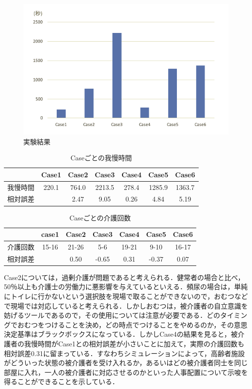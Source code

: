 \begin{figure}[htb]
\begin{center}
 \includegraphics[scale=0.5]{figures/result_1.png}
 \caption[実験結果]{実験結果 \label{result_v1}}
\end{center}
\end{figure}

\begin{table}[htb]
  \caption[Caseごとの我慢時間]{Caseごとの我慢時間}
  \label{relative_error}
  \centering
  \begin{tabular}{r|c|c|c|c|c|c}
     & Case1 & Case2 & Case3 & Case4 & Case5 & Case6 \\ \hline
    我慢時間 & 220.1 & 764.0 & 2213.5 & 278.4 & 1285.9 & 1363.7 \\
    相対誤差 & & 2.47 & 9.05 & 0.26 & 4.84 & 5.19 \\
    \end{tabular}
\end{table}


\begin{table}[htb]
  \caption[Caseごとの介護回数]{Caseごとの介護回数}
  \label{number_of_care}
  \centering
  \begin{tabular}{r|c|c|c|c|c|c}
     & case1 & Case2 & Case3 & Case4 & Case5 & Case6 \\ \hline
    介護回数 & 15-16 & 21-26 & 5-6 & 19-21 & 9-10 & 16-17 \\
    相対誤差 & & 0.50 & -0.65 & 0.31 & -0.37 & 0.07 \\
    \end{tabular}
\end{table}

Case2については，過剰介護が問題であると考えられる．健常者の場合と比べ，50％以上も介護士の労働力に悪影響を与えているといえる．頻尿の場合は，単純にトイレに行かないという選択肢を現場で取ることができないので，おむつなどで現場では対応していると考えられる．しかしおむつは，被介護者の自立意識を妨げるツールであるので，その使用については注意が必要である．どのタイミングでおむつをつけることを決め，どの時点でつけることをやめるのか，その意思決定基準はブラックボックスになっている．しかしCase4の結果を見ると，被介護者の我慢時間がCase1との相対誤差が小さいことに加えて，実際の介護回数も相対誤差0.31に留まっている．すなわちシミュレーションによって，高齢者施設がどういった状態の被介護者を受け入れるか，あるいはどの被介護者同士を同じ部屋に入れ，一人の被介護者に対応させるのかといった人事配置について示唆を得ることができることを示している．

